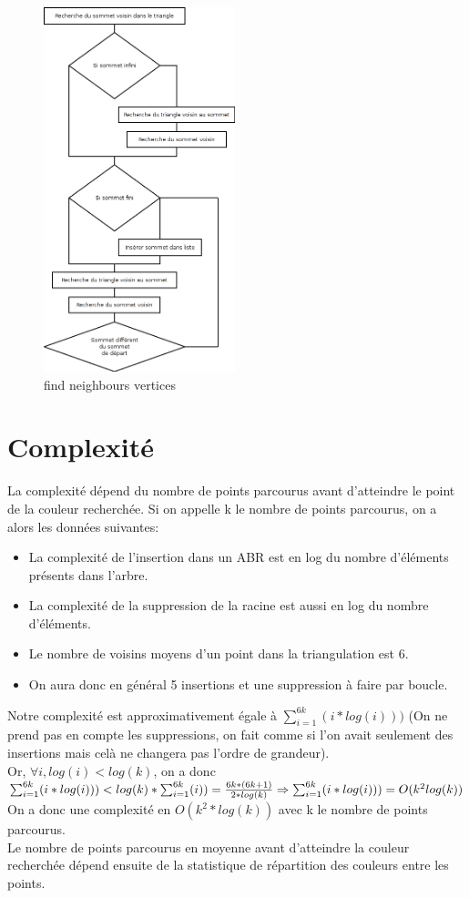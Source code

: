 \documentclass[a4paper, 11pt]{report}
\begin{document}
  	\begin{figure}[!h]
	\begin{center}
	\includegraphics[height=400px]{findNeighborVertices.png}
	\end{center}
	\caption[]{find neighbours vertices}
	\label{find}
	\end{figure}

  \section*{Complexité}
  La complexité dépend du nombre de points parcourus avant d'atteindre le point de la couleur recherchée.
  Si on appelle k le nombre de points parcourus, on a alors les données suivantes:
  \begin{itemize}
  \item La complexité de l'insertion dans un ABR est en log du nombre d'éléments présents dans l'arbre.
  \item La complexité de la suppression de la racine est aussi en log du nombre d'éléments.
  \item Le nombre de voisins moyens d'un point dans la triangulation est 6.
  \item On aura donc en général 5 insertions et une suppression à faire par boucle.
  \end{itemize}
  Notre complexité est approximativement égale à $\sum_{i=1}^{6 k} (i * log(i) ))$ (On ne prend pas en 
  compte les suppressions, on fait comme si l'on avait seulement des insertions mais celà ne changera pas 
  l'ordre de grandeur).\\
  Or, $\forall i, log(i) < log(k)$, on a donc\\
  $\sum_{i=1}^{6 k} (i * log(i) )) <  log(k) * \sum_{i=1}^{6 k} (i)) = \frac{6 k * (6 k + 1) }{ 2 * log(k)} \\
  \Rightarrow \sum_{i=1}^{6 k} (i * log(i) )) = O(k^2 log(k))$\\
  On a donc une complexité en $O(k^2*log(k))$ avec k le nombre de points parcourus.\\
  Le nombre de points parcourus en moyenne avant d'atteindre la couleur recherchée dépend ensuite de la
  statistique de répartition des couleurs entre les points.
\end{document}
